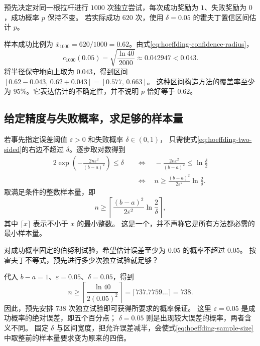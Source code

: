 \documentclass[UTF8]{ctexart}
\begin{document}
\begin{example}[估计一根拉杆的成功概率]
预先决定对同一根拉杆进行 $1000$ 次独立尝试，每次成功奖励为 $1$、失败奖励为 $0$，成功概率 $p$ 保持不变。
若实际成功 $620$ 次，使用 $\delta=0.05$ 的霍夫丁置信区间估计 $p$。
\end{example}
\begin{solve}
样本成功比例为 $\overline x_{1000}=620/1000=0.62$。由式\eqref{eq:hoeffding-confidence-radius}，
\[
  c_{1000}(0.05)=\sqrt{\frac{\ln40}{2000}}
  \approx0.042947<0.043.
\]
将半径保守地向上取为 $0.043$，得到区间
$[0.62-0.043,\,0.62+0.043]=[0.577,\,0.663]$。
这种区间构造方法的覆盖率至少为 $95\%$。它表达估计的不确定性，并不说明 $p$ 恰好等于 $0.62$。
\end{solve}

\subsection{给定精度与失败概率，求足够的样本量}

若事先指定误差阈值 $\varepsilon>0$ 和失败概率 $\delta\in(0,1)$，
只需使式\eqref{eq:hoeffding-two-sided}的右边不超过 $\delta$。逐步取对数得到
\begin{align*}
  2\exp\!\left(-\frac{2n\varepsilon^2}{(b-a)^2}\right)\leq\delta
  &\quad\Longleftrightarrow\quad
  -\frac{2n\varepsilon^2}{(b-a)^2}\leq\ln\frac{\delta}{2}\\
  &\quad\Longleftrightarrow\quad
  n\geq\frac{(b-a)^2}{2\varepsilon^2}\ln\frac{2}{\delta}.
\end{align*}
取满足条件的整数样本量，即
\begin{equation}
  n\geq\left\lceil
    \frac{(b-a)^2}{2\varepsilon^2}\ln\frac{2}{\delta}
  \right\rceil,
  \label{eq:hoeffding-sample-size}
\end{equation}
其中 $\lceil x\rceil$ 表示不小于 $x$ 的最小整数。
这是一个，并不声称它是所有方法都必需的最小样本量。

\begin{example}[允许误差为五个百分点]
对成功概率固定的伯努利试验，希望估计误差至少为 $0.05$ 的概率不超过 $0.05$。
按霍夫丁不等式，预先进行多少次独立试验就足够？
\end{example}
\begin{solve}
代入 $b-a=1$、$\varepsilon=0.05$、$\delta=0.05$，得到
\[
  n\geq\left\lceil\frac{\ln40}{2(0.05)^2}\right\rceil
   =\lceil737.7759\ldots\rceil=738.
\]
因此，预先安排 $738$ 次独立试验即可获得所要求的概率保证。
这里 $\varepsilon=0.05$ 是成功概率的绝对误差，即五个百分点；
$\delta=0.05$ 则是出现较大误差的概率，两者含义不同。
固定 $\delta$ 与区间宽度，把允许误差减半，会使式\eqref{eq:hoeffding-sample-size}中取整前的样本量要求变为原来的四倍。
\end{solve}
\end{document}
